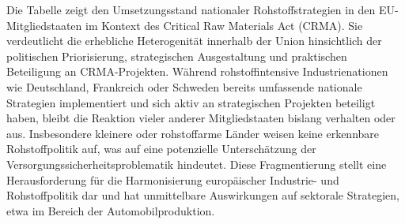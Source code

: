 \documentclass[12pt,a4paper,oneside]{book} %
\begin{document}
Die Tabelle zeigt den Umsetzungsstand nationaler Rohstoffstrategien in den EU-Mitgliedstaaten im Kontext des Critical Raw Materials Act (CRMA). Sie verdeutlicht die erhebliche Heterogenität innerhalb der Union hinsichtlich der politischen Priorisierung, strategischen Ausgestaltung und praktischen Beteiligung an CRMA-Projekten. Während rohstoffintensive Industrienationen wie Deutschland, Frankreich oder Schweden bereits umfassende nationale Strategien implementiert und sich aktiv an strategischen Projekten beteiligt haben, bleibt die Reaktion vieler anderer Mitgliedstaaten bislang verhalten oder aus. Insbesondere kleinere oder rohstoffarme Länder weisen keine erkennbare Rohstoffpolitik auf, was auf eine potenzielle Unterschätzung der Versorgungssicherheitsproblematik hindeutet. Diese Fragmentierung stellt eine Herausforderung für die Harmonisierung europäischer Industrie- und Rohstoffpolitik dar und hat unmittelbare Auswirkungen auf sektorale Strategien, etwa im Bereich der Automobilproduktion.
\end{document}
